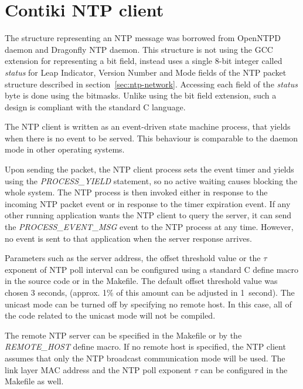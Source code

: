 
\section{Contiki NTP client}
The structure representing an NTP message was borrowed from OpenNTPD daemon
and Dragonfly NTP daemon.
This structure is not using the GCC extension for representing a bit field,
instead uses a single 8-bit integer called {\it{status}}
for Leap Indicator, Version Number and Mode fields of the NTP packet
structure described in section~\ref{sec:ntp-network}.
Accessing each field of the {\it{status}} byte is done using the bitmasks.
Unlike using the bit field extension,
such a design is compliant with the standard C language.

The NTP client is written as an event-driven state machine process,
that yields when there is no event to be served.
This behaviour is comparable to the daemon mode in other operating systems.

Upon sending the packet, the NTP client process sets the event timer and yields
using the {\it{PROCESS\_YIELD}} statement,
so no active waiting causes blocking the whole system.
The NTP process is then invoked either in response to the incoming NTP packet event
or in response to the timer expiration event.
If any other running application wants the NTP client to query the server,
it can send the {\it{PROCESS\_EVENT\_MSG}} event to the NTP process at any time.
However, no event is sent to that application when the server response arrives.

Parameters such as the server address, the offset threshold value
or the $\tau$ exponent of NTP poll interval can be configured using a standard C define macro
in the source code or in the Makefile.
The default offset threshold value was chosen 3 seconds,
(approx. 1\% of this amount can be adjusted in 1~second).
The unicast mode can be turned off by specifying no remote host.
In this case, all of the code related to the unicast mode will not be compiled.

The remote NTP server can be specified in the Makefile or
by the {\it{REMOTE\_HOST}} define macro.
If no remote host is specified, the NTP client assumes that only the NTP broadcast communication mode will be used.
The link layer MAC address and the NTP poll exponent $\tau$
can be configured in the Makefile as well.


